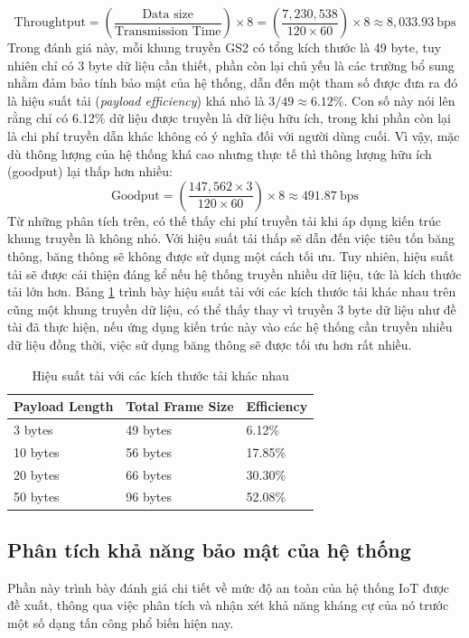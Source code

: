 \[
\text{Throughtput} = \left( \frac{\text{Data size}}{\text{Transmission Time}} \right) \times 8 = \left( \frac{7,230,538}{120 \times 60} \right) \times 8 \approx 8,033.93 \ \text{bps}
\]
Trong đánh giá này, mỗi khung truyền GS2 có tổng kích thước là 49 byte, tuy nhiên chỉ có 3 byte dữ liệu cần thiết, phần còn lại chủ yếu là các trường bổ sung nhằm đảm bảo tính bảo mật của hệ thống, dẫn đến một tham số được đưa ra đó là hiệu suất tải (\textit{payload efficiency}) khá nhỏ là $3/49 \approx 6.12\%$. Con số này nói lên rằng chỉ có 6.12\% dữ liệu được truyền là dữ liệu hữu ích, trong khi phần còn lại là chi phí truyền dẫn khác không có ý nghĩa đối với người dùng cuối. Vì vậy, mặc dù thông lượng của hệ thống khá cao nhưng thực tế thì thông lượng hữu ích (goodput) lại thấp hơn nhiều:
\[
\text{Goodput} = \left( \frac{147,562 \times 3}{120 \times 60} \right) \times 8 \approx 491.87 \ \text{bps}
\]
Từ những phân tích trên, có thế thấy chi phí truyền tải khi áp dụng kiến trúc khung truyền là không nhỏ. Với hiệu suất tải thấp sẽ dẫn đến việc tiêu tốn băng thông, băng thông sẽ không được sử dụng một cách tối ưu. Tuy nhiên, hiệu suất tải sẽ được cải thiện đáng kể nếu hệ thống truyền nhiều dữ liệu, tức là kích thước tải lớn hơn. Bảng \ref{tab:efficiency} trình bày hiệu suất tải với các kích thước tải khác nhau trên cũng một khung truyền dữ liệu, có thể thấy thay vì truyền 3 byte dữ liệu như đề tài đã thực hiện, nếu ứng dụng kiến trúc này vào các hệ thống cần truyền nhiều dữ liệu đồng thời, việc sử dụng băng thông sẽ được tối ưu hơn rất nhiều.
\begin{table}[h]
\centering
\small
\caption{Hiệu suất tải với các kích thước tải khác nhau}
\label{tab:efficiency}
\begin{tabular}{|p{4cm}|p{5cm}|p{3cm}|}
\hline
Payload Length & Total Frame Size & Efficiency \\
\hline
3 bytes   & 49 bytes  & 6.12\%  \\
10 bytes  & 56 bytes & 17.85\% \\
20 bytes  & 66 bytes & 30.30\% \\
50 bytes  & 96 bytes & 52.08\% \\
\hline
\end{tabular}
\end{table}
\subsection{Phân tích khả năng bảo mật của hệ thống}
Phần này trình bày đánh giá chi tiết về mức độ an toàn của hệ thống IoT được đề xuất, thông qua việc phân tích và nhận xét khả năng kháng cự của nó trước một số dạng tấn công phổ biến hiện nay.

